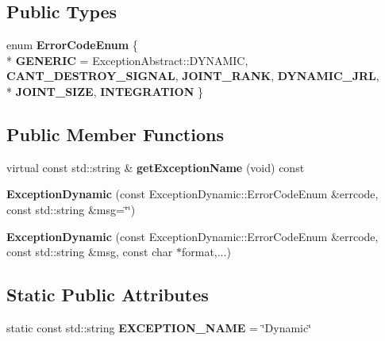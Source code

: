 \subsection*{Public Types}
\begin{DoxyCompactItemize}
\item 
enum {\bfseries Error\+Code\+Enum} \{ \\*
{\bfseries G\+E\+N\+E\+R\+IC} = Exception\+Abstract\+:\+:D\+Y\+N\+A\+M\+IC, 
{\bfseries C\+A\+N\+T\+\_\+\+D\+E\+S\+T\+R\+O\+Y\+\_\+\+S\+I\+G\+N\+AL}, 
{\bfseries J\+O\+I\+N\+T\+\_\+\+R\+A\+NK}, 
{\bfseries D\+Y\+N\+A\+M\+I\+C\+\_\+\+J\+RL}, 
\\*
{\bfseries J\+O\+I\+N\+T\+\_\+\+S\+I\+ZE}, 
{\bfseries I\+N\+T\+E\+G\+R\+A\+T\+I\+ON}
 \}\hypertarget{classdynamic__graph_1_1ExceptionDynamic_a928d14f0f9bbd488f42a2d7577fb341b}{}\label{classdynamic__graph_1_1ExceptionDynamic_a928d14f0f9bbd488f42a2d7577fb341b}

\end{DoxyCompactItemize}
\subsection*{Public Member Functions}
\begin{DoxyCompactItemize}
\item 
virtual const std\+::string \& {\bfseries get\+Exception\+Name} (void) const \hypertarget{classdynamic__graph_1_1ExceptionDynamic_ab70632639ed4d4b00d9d3840c710d414}{}\label{classdynamic__graph_1_1ExceptionDynamic_ab70632639ed4d4b00d9d3840c710d414}

\item 
{\bfseries Exception\+Dynamic} (const Exception\+Dynamic\+::\+Error\+Code\+Enum \&errcode, const std\+::string \&msg=\char`\"{}\char`\"{})\hypertarget{classdynamic__graph_1_1ExceptionDynamic_a733c68c022311f9418a97fe1687c813a}{}\label{classdynamic__graph_1_1ExceptionDynamic_a733c68c022311f9418a97fe1687c813a}

\item 
{\bfseries Exception\+Dynamic} (const Exception\+Dynamic\+::\+Error\+Code\+Enum \&errcode, const std\+::string \&msg, const char $\ast$format,...)\hypertarget{classdynamic__graph_1_1ExceptionDynamic_a5f5cdec1772f2cbd833b0134bfcb0980}{}\label{classdynamic__graph_1_1ExceptionDynamic_a5f5cdec1772f2cbd833b0134bfcb0980}

\end{DoxyCompactItemize}
\subsection*{Static Public Attributes}
\begin{DoxyCompactItemize}
\item 
static const std\+::string {\bfseries E\+X\+C\+E\+P\+T\+I\+O\+N\+\_\+\+N\+A\+ME} = \char`\"{}Dynamic\char`\"{}\hypertarget{classdynamic__graph_1_1ExceptionDynamic_a29aa1b98aa4219a3a99ae314f2b8c1ef}{}\label{classdynamic__graph_1_1ExceptionDynamic_a29aa1b98aa4219a3a99ae314f2b8c1ef}

\end{DoxyCompactItemize}
